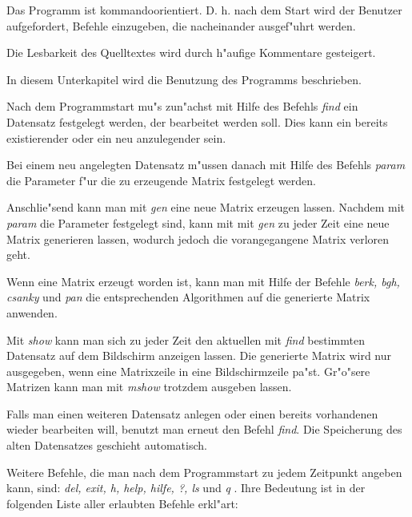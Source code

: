 Das Programm ist kommandoorientiert. D. h. nach dem Start wird der 
Benutzer aufgefordert, Befehle einzugeben, die nacheinander ausgef"uhrt 
werden.

Die Lesbarkeit des Quelltextes wird durch h"aufige Kommentare gesteigert.


\label{SecBedienung}

In diesem Unterkapitel wird die Benutzung des Programms beschrieben.

Nach dem Programmstart mu"s zun"achst mit Hilfe des Befehls {\em find}
ein Datensatz festgelegt werden, der bearbeitet werden soll. Dies kann
ein bereits existierender oder ein neu anzulegender sein.

Bei einem neu angelegten Datensatz m"ussen danach mit Hilfe des Befehls 
{\em param} die Parameter f"ur die zu erzeugende Matrix festgelegt werden.

Anschlie"send kann man mit {\em gen} eine neue Matrix erzeugen lassen.
Nachdem mit {\em param} die Parameter festgelegt sind, kann mit mit {\em gen}
zu jeder Zeit eine neue Matrix generieren lassen, wodurch jedoch die 
vorangegangene Matrix verloren geht.

Wenn eine Matrix erzeugt worden ist, kann man mit Hilfe der Befehle
{\em berk, bgh, csanky} und {\em pan} die entsprechenden Algorithmen auf 
die generierte Matrix anwenden.

Mit {\em show} kann man sich zu jeder Zeit den aktuellen mit {\em find}
bestimmten Datensatz auf dem Bildschirm anzeigen lassen. Die generierte
Matrix wird nur ausgegeben, wenn eine Matrixzeile in eine Bildschirmzeile 
pa"st. Gr"o"sere Matrizen kann man mit {\em mshow} trotzdem ausgeben 
lassen.

Falls man einen weiteren Datensatz anlegen oder einen bereits vorhandenen
wieder bearbeiten will, benutzt man erneut den Befehl {\em find}. Die
Speicherung des alten Datensatzes geschieht automatisch.

Weitere Befehle, die man nach dem Programmstart zu jedem Zeitpunkt angeben
kann, sind: {\em del, exit, h, help, hilfe, ?, ls} und {\em q} . Ihre
Bedeutung ist in der folgenden Liste aller erlaubten Befehle erkl"art:

